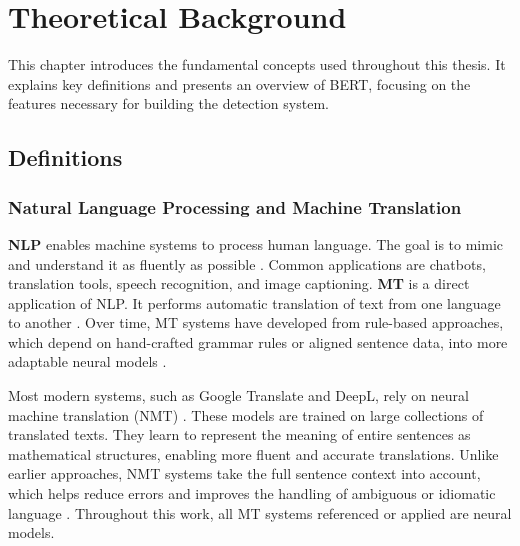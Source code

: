 \chapter{Theoretical Background}
This chapter introduces the fundamental concepts used throughout this thesis. It explains key definitions and presents an overview of BERT, focusing on the features necessary for building the detection system.


\section{Definitions}
\subsection{Natural Language Processing and Machine Translation}
    \textbf{NLP} enables machine systems to process human language. The goal is to mimic and understand it as fluently as possible \parencite{smacchiaDoesAIReflect2024,ullmannGenderBiasMachine2022}. Common applications are chatbots, translation tools, speech recognition, and image captioning. \textbf{MT} is a direct application of NLP. It performs automatic translation of text from one language to another \parencite{linMachineTranslationAcademic2009}. Over time, MT systems have developed from rule-based approaches, which depend on hand-crafted grammar rules or aligned sentence data, into more adaptable neural models \parencite{chakravarthiSurveyOrthographicInformation2021}.

    Most modern systems, such as Google Translate and DeepL, rely on neural machine translation (NMT) \parencite{wuGooglesNeuralMachine2016,deeplHowDoesDeepL2021}. These models are trained on large collections of translated texts. They learn to represent the meaning of entire sentences as mathematical structures, enabling more fluent and accurate translations. Unlike earlier approaches, NMT systems take the full sentence context into account, which helps reduce errors and improves the handling of ambiguous or idiomatic language \parencite{wuGooglesNeuralMachine2016}. Throughout this work, all MT systems referenced or applied are neural models.

